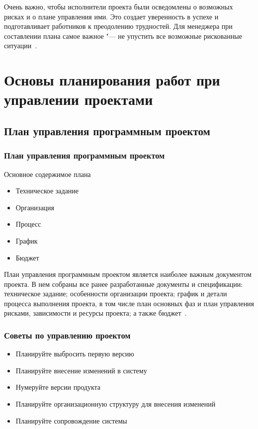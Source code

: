 \documentclass{../industrial-development}
\begin{document}
Очень важно, чтобы исполнители проекта были осведомлены о возможных рисках и о плане управления ими. Это создает уверенность в успехе и подготавливает работников к преодолению трудностей. Для менеджера при составлении плана самое важное "--- не упустить все возможные рискованные ситуации~\cite[с.~68--70]{Skopin}.

\section{Основы планирования работ при управлении проектами}

\subsection{План управления программным проектом}

\begin{frame} \frametitle{План управления программным проектом}
  \begin{block}{Основное содержимое плана}
    \begin{itemize}
     \item Техническое задание
     \item Организация
     \item Процесс
     \item График
     \item Бюджет
    \end{itemize}
  \end{block}
\end{frame}

\lecturenotes

План управления программным проектом является наиболее важным документом проекта. В нем собраны все ранее разработанные документы и спецификации: техническое задание; особенности организации проекта; график и детали процесса выполнения проекта, в том числе план основных фаз и план управления рисками, зависимости и ресурсы проекта; а также бюджет~\cite[с.~252]{Fatrell}.

\begin{frame} \frametitle{Советы по управлению проектом}
    \begin{itemize}
     \item Планируйте выбросить первую версию
     \item Планируйте внесение изменений в систему
     \item Нумеруйте версии продукта
     \item Планируйте организационную структуру для внесения изменений
     \item Планируйте сопровождение системы
    \end{itemize}
\end{frame}
\end{document}
